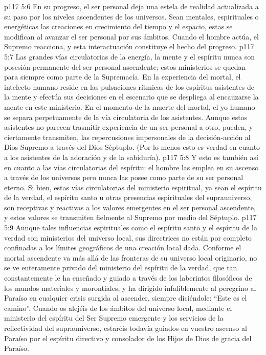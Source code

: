 \vs p117 5:6 En su progreso, el ser personal deja una estela de realidad actualizada a su paso por los niveles ascendentes de los universos. Sean mentales, espirituales o energéticas las creaciones en crecimiento del tiempo y el espacio, estas se modifican al avanzar el ser personal por sus ámbitos. Cuando el hombre actúa, el Supremo reacciona, y esta interactuación constituye el hecho del progreso.
\vs p117 5:7 Las grandes vías circulatorias de la energía, la mente y el espíritu nunca son posesión permanente del ser personal ascendente; estos ministerios se quedan para siempre como parte de la Supremacía. En la experiencia del mortal, el intelecto humano reside en las pulsaciones rítmicas de los espíritus asistentes de la mente y efectúa sus decisiones en el escenario que se despliega al encauzarse la mente en este ministerio. En el momento de la muerte del mortal, el yo humano se separa perpetuamente de la vía circulatoria de los asistentes. Aunque estos asistentes no parecen trasmitir experiencia de un ser personal a otro, pueden, y ciertamente transmiten, las repercusiones impersonales de la decisión\hyp{}acción al Dios Supremo a través del Dios Séptuplo. (Por lo menos esto es verdad en cuanto a los asistentes de la adoración y de la sabiduría).
\vs p117 5:8 Y esto es también así en cuanto a las vías circulatorias del espíritu: el hombre las emplea en su ascenso a través de los universos pero nunca las posee como parte de su ser personal eterno. Si bien, estas vías circulatorias del ministerio espiritual, ya sean el espíritu de la verdad, el espíritu santo u otras presencias espirituales del suprauniverso, son receptivas y reactivas a los valores emergentes en el ser personal ascendente, y estos valores se transmiten fielmente al Supremo por medio del Séptuplo.
\vs p117 5:9 \pc Aunque tales influencias espirituales como el espíritu santo y el espíritu de la verdad son ministerios del universo local, sus directrices no están por completo confinadas a los límites geográficos de una creación local dada. Conforme el mortal ascendente va más allá de las fronteras de su universo local originario, no se ve enteramente privado del ministerio del espíritu de la verdad, que tan constantemente le ha enseñado y guiado a través de los laberintos filosóficos de los mundos materiales y morontiales, y ha dirigido infaliblemente al peregrino al Paraíso en cualquier crisis surgida al ascender, siempre diciéndole: “Este es el camino”. Cuando os alejéis de los ámbitos del universo local, mediante el ministerio del espíritu del Ser Supremo emergente y los servicios de la reflectividad del suprauniverso, estaréis todavía guiados en vuestro ascenso al Paraíso por el espíritu directivo y consolador de los Hijos de Dios de gracia del Paraíso.
